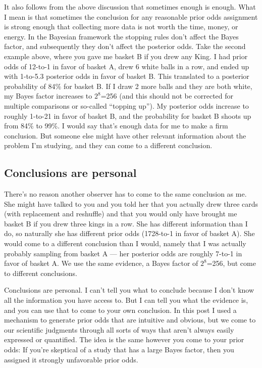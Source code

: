 It also follows from the above discussion that sometimes enough is enough. What I mean is that sometimes the conclusion for any reasonable prior odds assignment is strong enough that collecting more data is not worth the time, money, or energy. In the Bayesian framework the stopping rules don't affect the Bayes factor, and subsequently they don't affect the posterior odds. Take the second example above, where you gave me basket B if you drew any King. I had prior odds of 12-to-1 in favor of basket A, drew 6 white balls in a row, and ended up with 1-to-5.3 posterior odds in favor of basket B. This translated to a posterior probability of 84\% for basket B. If I draw 2 more balls and they are both white, my Bayes factor increases to $2^8$=256 (and this should not be corrected for multiple comparisons or so-called ``topping up''). My posterior odds increase to roughly 1-to-21 in favor of basket B, and the probability for basket B shoots up from 84\% to 99\%. I would say that's enough data for me to make a firm conclusion. But someone else might have other relevant information about the problem I'm studying, and they can come to a different conclusion.

\subsection{Conclusions are personal}

There's no reason another observer has to come to the same conclusion as me. She might have talked to you and you told her that you actually drew three cards (with replacement and reshuffle) and that you would only have brought me basket B if you drew three kings in a row. She has different information than I do, so naturally she has different prior odds (1728-to-1 in favor of basket A). She would come to a different conclusion than I would, namely that I was actually probably sampling from basket A — her posterior odds are roughly 7-to-1 in favor of basket A. We use the same evidence, a Bayes factor of $2^8$=256, but come to different conclusions. 

Conclusions are personal. I can't tell you what to conclude because I don't know all the information you have access to. But I can tell you what the evidence is, and you can use that to come to your own conclusion. In this post I used a mechanism to generate prior odds that are intuitive and obvious, but we come to our scientific judgments through all sorts of ways that aren't always easily expressed or quantified. The idea is the same however you come to your prior odds: If you're skeptical of a study that has a large Bayes factor, then you assigned it strongly unfavorable prior odds.

